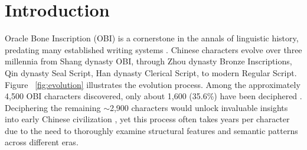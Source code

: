 \documentclass{article}
\begin{document}


\section{Introduction}
Oracle Bone Inscription (OBI) is a cornerstone in the annals of linguistic history, predating many established writing systems \cite{gil2020will}. Chinese characters evolve over three millennia from Shang dynasty OBI, through Zhou dynasty Bronze Inscriptions, Qin dynasty Seal Script, Han dynasty Clerical Script, to modern Regular Script. Figure ~\ref{fig:evolution} illustrates the evolution process. Among the approximately 4,500 OBI characters discovered, only about 1,600 (35.6\%) have been deciphered \cite{keightley1985sources, li2020hwobc}. Deciphering the remaining $\sim$2,900 characters would unlock invaluable insights into early Chinese civilization \cite{wang2024dataset}, yet this process often takes years per character due to the need to thoroughly examine structural features and semantic patterns across different eras.
\end{document}
